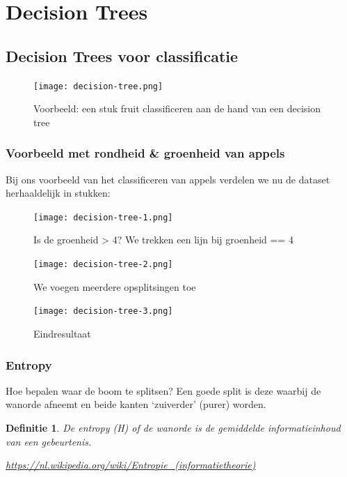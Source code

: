 \documentclass{article}
\newtheorem{theorem}{Definitie}[section]
\begin{document}
\section{Decision Trees}
\subsection{Decision Trees voor classificatie}

\begin{figure}[H]
    \centering
    \texttt{[image: decision-tree.png]}
    \caption{Voorbeeld: een stuk fruit classificeren aan de hand van een decision tree}
\end{figure}

\subsubsection{Voorbeeld met rondheid \& groenheid van appels}


Bij ons voorbeeld van het classificeren van appels verdelen we nu de dataset herhaaldelijk in stukken:

\begin{figure}[H]
    \centering
    \texttt{[image: decision-tree-1.png]}
    \caption{Is de groenheid > 4? We trekken een lijn bij groenheid == 4}
\end{figure}

\begin{figure}[H]
    \centering
    \texttt{[image: decision-tree-2.png]}
    \caption{We voegen meerdere opsplitsingen toe}
\end{figure}

\begin{figure}[H]
    \centering
    \texttt{[image: decision-tree-3.png]}
    \caption{Eindresultaat}
\end{figure}

\subsubsection{Entropy}

Hoe bepalen waar de boom te splitsen? 
Een goede split is deze waarbij de wanorde afneemt en beide kanten `zuiverder' (purer) worden.

\begin{theorem}
    De entropy (H) of de wanorde is de gemiddelde informatieinhoud van een gebeurtenis. 

    \url{https://nl.wikipedia.org/wiki/Entropie_(informatietheorie)}
\end{theorem}
\end{document}
